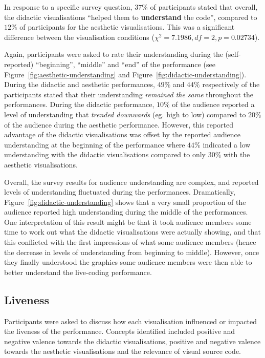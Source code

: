 In response to a specific survey question, $37\%$ of participants stated that overall, the didactic visualisations ``helped them to \textbf{understand} the code'', compared to $12\%$ of participants for the aesthetic visualisations. This was a significant difference between the visualisation conditions ($\chi^2=7.1986,df=2,p=0.02734$).

Again, participants were asked to rate their understanding during the (self-reported) ``beginning'', ``middle'' and ``end'' of the performance (see Figure~\ref{fig:aesthetic-understanding} and Figure~\ref{fig:didactic-understanding}). During the didactic and aesthetic performances, $49\%$ and $44\%$ respectively of the participants stated that their understanding \emph{remained the same} throughout the performances. During the didactic performance, $10\%$ of the audience reported a level of understanding that \emph{trended downwards} (eg. high to low) compared to $20\%$ of the audience during the aesthetic performance. However, this reported advantage of the didactic visualisations was offset by the reported audience understanding at the beginning of the performance where $44\%$ indicated a low understanding with the didactic visualisations compared to only $30\%$ with the aesthetic visualisations. 

Overall, the survey results for audience understanding are complex, and reported levels of understanding fluctuated during the performances. Dramatically, Figure~\ref{fig:didactic-understanding} shows that a very small proportion of the audience reported high understanding during the middle of the performances. One interpretation of this result might be that it took audience members some time to work out what the didactic visualisations were actually showing, and that this conflicted with the first impressions of what some audience members (hence the decrease in levels of understanding from beginning to middle). However, once they finally understood the graphics some audience members were then able to better understand the live-coding performance.

\subsection{Liveness}

Participants were asked to discuss how each visualisation influenced or impacted the liveness of the performance. Concepts identified included positive and negative valence towards the didactic visualisations, positive and negative valence towards the aesthetic visualisations and the relevance of visual source code. 

